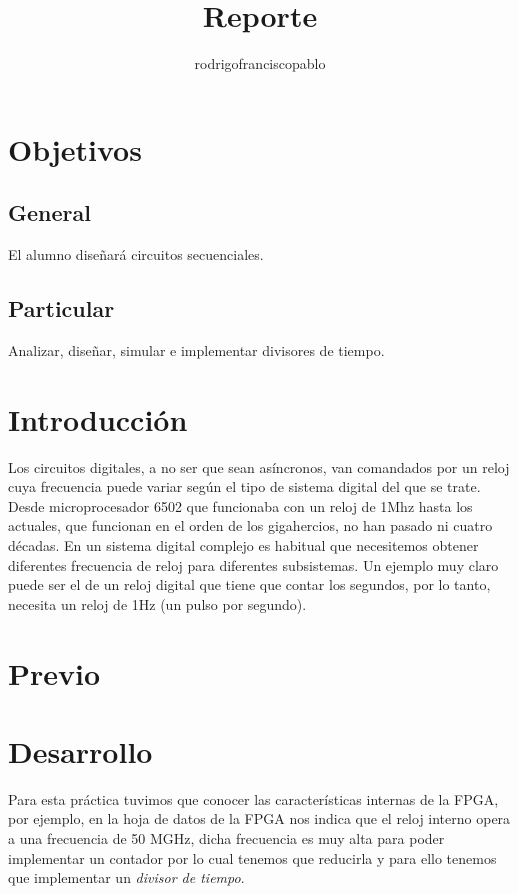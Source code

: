 \documentclass{mylib/reporteConCalif}
\title{Reporte}
\author{rodrigofranciscopablo }
\begin{document}
\coverPage

\section{Objetivos}

\subsection{General}

El alumno diseñará circuitos secuenciales.

\subsection{Particular}

Analizar, diseñar, simular e implementar divisores de tiempo.

\section{Introducción}
Los circuitos digitales, a no ser que sean asíncronos, van comandados por un reloj cuya frecuencia puede variar según el tipo de sistema digital del que se trate. Desde microprocesador 6502 que funcionaba con un reloj de 1Mhz hasta los actuales, que funcionan en el orden de los gigahercios, no han pasado ni cuatro décadas. En un sistema digital complejo es habitual que necesitemos obtener diferentes frecuencia de reloj para diferentes subsistemas. Un ejemplo muy claro puede ser el de un reloj digital que tiene que contar los segundos, por lo tanto, necesita un reloj de 1Hz (un pulso por segundo).


\newpage
\section{Previo}

\newpage
\section{Desarrollo}

Para esta práctica tuvimos que conocer las características internas de la FPGA, por ejemplo, en la hoja de datos de la FPGA nos indica que el reloj interno opera a una frecuencia de 50 MGHz, dicha frecuencia es muy alta para poder implementar un contador por lo cual tenemos que reducirla y para ello tenemos que implementar un \textit{divisor de tiempo}.
\end{document}
